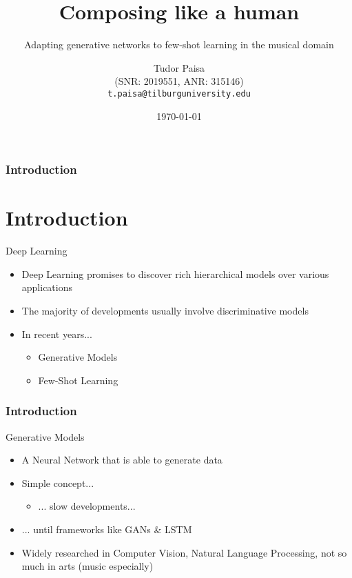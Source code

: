 \documentclass{beamer}
\title[Composing like a human]{Composing like a human}
\subtitle{Adapting generative networks to few-shot learning in the musical domain}
\author{Tudor Paisa  \texorpdfstring{\\ (SNR: 2019551, ANR: 315146)}{} \texorpdfstring{\\ \texttt{t.paisa@tilburguniversity.edu}}{} }
\institute{Tilburg University}
\date{\today}
\begin{document}
\begin{frame}
    \titlepage
\end{frame}


\begin{frame}
    \frametitle{Introduction}
    \section{Introduction}
    \begin{block}{Deep Learning}
    \begin{itemize}
        \item Deep Learning promises to discover rich hierarchical models over various applications
        \item The majority of developments usually involve discriminative models
        \item In recent years...
            \begin{itemize}
            \item Generative Models
            \item Few-Shot Learning
            \end{itemize}
    \end{itemize}
\end{block}
\end{frame}

\begin{frame}
    \frametitle{Introduction}
    \begin{block}{Generative Models}
        \begin{itemize}
            \item A Neural Network that is able to generate data
            \item Simple concept...
                \begin{itemize}
                    \item ... slow developments...
                \end{itemize}
            \item ... until frameworks like GANs \& LSTM
            \item Widely researched in Computer Vision, Natural Language Processing, not so much in arts (music especially)
        \end{itemize}
    \end{block}
\end{frame}
\end{document}
